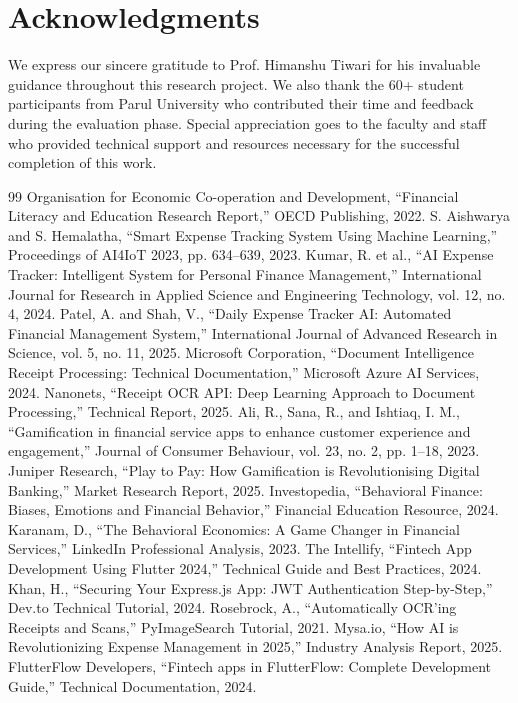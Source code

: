 \documentclass[10pt,twocolumn,twoside,a4paper]{article}
\begin{document}
\section*{Acknowledgments}
We express our sincere gratitude to Prof. Himanshu Tiwari for his invaluable guidance throughout this research project. We also thank the 60+ student participants from Parul University who contributed their time and feedback during the evaluation phase. Special appreciation goes to the faculty and staff who provided technical support and resources necessary for the successful completion of this work.

\begin{thebibliography}{99}
 Organisation for Economic Co-operation and Development, ``Financial Literacy and Education Research Report,'' OECD Publishing, 2022.
 S. Aishwarya and S. Hemalatha, ``Smart Expense Tracking System Using Machine Learning,'' Proceedings of AI4IoT 2023, pp. 634--639, 2023.
 Kumar, R. et al., ``AI Expense Tracker: Intelligent System for Personal Finance Management,'' International Journal for Research in Applied Science and Engineering Technology, vol. 12, no. 4, 2024.
 Patel, A. and Shah, V., ``Daily Expense Tracker AI: Automated Financial Management System,'' International Journal of Advanced Research in Science, vol. 5, no. 11, 2025.
 Microsoft Corporation, ``Document Intelligence Receipt Processing: Technical Documentation,'' Microsoft Azure AI Services, 2024.
 Nanonets, ``Receipt OCR API: Deep Learning Approach to Document Processing,'' Technical Report, 2025.
 Ali, R., Sana, R., and Ishtiaq, I. M., ``Gamification in financial service apps to enhance customer experience and engagement,'' Journal of Consumer Behaviour, vol. 23, no. 2, pp. 1--18, 2023.
 Juniper Research, ``Play to Pay: How Gamification is Revolutionising Digital Banking,'' Market Research Report, 2025.
 Investopedia, ``Behavioral Finance: Biases, Emotions and Financial Behavior,'' Financial Education Resource, 2024.
 Karanam, D., ``The Behavioral Economics: A Game Changer in Financial Services,'' LinkedIn Professional Analysis, 2023.
 The Intellify, ``Fintech App Development Using Flutter 2024,'' Technical Guide and Best Practices, 2024.
 Khan, H., ``Securing Your Express.js App: JWT Authentication Step-by-Step,'' Dev.to Technical Tutorial, 2024.
 Rosebrock, A., ``Automatically OCR'ing Receipts and Scans,'' PyImageSearch Tutorial, 2021.
 Mysa.io, ``How AI is Revolutionizing Expense Management in 2025,'' Industry Analysis Report, 2025.
 FlutterFlow Developers, ``Fintech apps in FlutterFlow: Complete Development Guide,'' Technical Documentation, 2024.
\end{thebibliography}
\end{document}
